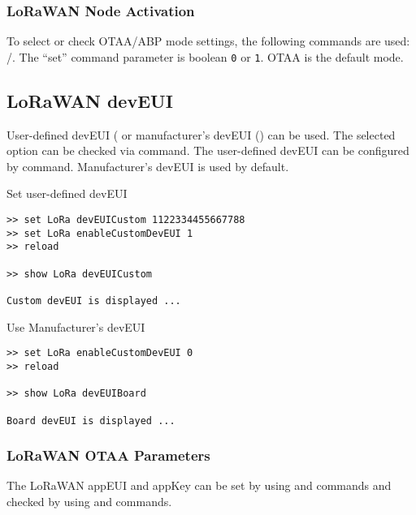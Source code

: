 \subsubsection{LoRaWAN Node Activation}
To select or check OTAA/ABP mode settings, the following commands are used: /. The “set” command parameter is boolean {\tt 0} or {\tt 1}. OTAA is the default mode.

\subsection{LoRaWAN devEUI}
User-defined devEUI ( or manufacturer's devEUI () can be used. The selected option can be checked via  command. The user-defined devEUI can be configured by  command. Manufacturer's devEUI is used by default.

\clearpage

\begin{docCodeExampleTitled}{Set user-defined devEUI}
\begin{verbatim}
>> set LoRa devEUICustom 1122334455667788
>> set LoRa enableCustomDevEUI 1
>> reload

>> show LoRa devEUICustom

Custom devEUI is displayed ...
\end{verbatim}
\end{docCodeExampleTitled}

\begin{docCodeExampleTitled}{Use Manufacturer's devEUI}
\begin{verbatim}
>> set LoRa enableCustomDevEUI 0
>> reload

>> show LoRa devEUIBoard

Board devEUI is displayed ...
\end{verbatim}
\end{docCodeExampleTitled}

\subsubsection{LoRaWAN OTAA Parameters}
The LoRaWAN appEUI and appKey can be set by using  and  commands and checked by using  and  commands.
  
